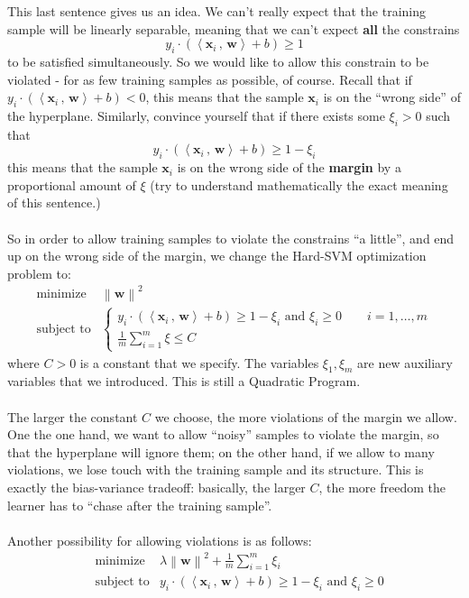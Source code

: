 \documentclass[11pt]{article}
\newcommand{\norm}[1]{\left\| #1\right\|}
\newcommand{\innerr}[2]{{\left\langle #1\,,\,#2 \right\rangle}}
\newcommand{\VV}[1]{\mathbf{#1}}
\begin{document}
  This last sentence gives us an idea. We can't really expect that the training
  sample will be linearly separable, meaning that we can't expect {\bf all} the
  constrains
   \[
    y_i \cdot \left( \innerr{\VV{x}_i}{\VV{w}}
      +b \right) \geq 1  
  \]
  to be satisfied simultaneously. So we would like to allow this constrain to be
  violated - for as few training samples as possible, of course. Recall that if
  $ y_i \cdot \left( \innerr{\VV{x}_i}{\VV{w}}
  +b \right) <0$, this means that the sample $\VV{x}_i$ is on the ``wrong side''
  of the hyperplane. Similarly, convince yourself that if there exists some
  $\xi_i>0$ such that 
  \[
  y_i \cdot \left( \innerr{\VV{x}_i}{\VV{w}}
+b \right) \geq 1-\xi_i  \]
this means that the sample $\VV{x}_i$ is  on the wrong side of the {\bf margin}
by a proportional amount of $\xi$ (try to understand mathematically the exact meaning of this
sentence.)
\\~\\ So in order to allow training samples to violate the constrains ``a
little'', and end up on the wrong side of the margin, we change the Hard-SVM
optimization problem to:
\begin{eqnarray*}
      & \text{minimize}   &  \norm {\VV{w}}^2 \\
      & \text{subject to} & \begin{cases} y_i \cdot \left( \innerr{\VV{x}_i}{\VV{w}}
     +b \right) \geq 1-\xi_i  \,\,\text{and}\,\, \xi_i\geq 0 \qquad 
i=1,\ldots,m & \\
 \frac{1}{m}\sum_{i=1}^m \xi \leq C &
 \end{cases}
    \end{eqnarray*}
    where $C>0$ is a constant that we specify. The variables $\xi_1,\xi_m$ are
    new auxiliary variables that we introduced. This is still a Quadratic
    Program.
    \\~\\
    The larger the constant $C$ we choose, the more violations of the margin we
    allow. One the one hand, we want to allow ``noisy'' samples to violate the
    margin, so that the hyperplane will ignore them; on the other hand, 
    if we allow to many violations, we lose touch with the training sample and
    its structure. This is exactly the bias-variance tradeoff: basically, the
    larger $C$, the more freedom the learner has to ``chase after the training
    sample''. 
\\~\\
Another possibility for allowing violations is as follows:
\begin{eqnarray*}
      & \text{minimize}   &  \lambda \norm {\VV{w}}^2 + \frac{1}{m}\sum_{i=1}^m
      \xi_i \\
      & \text{subject to} & y_i \cdot \left( \innerr{\VV{x}_i}{\VV{w}}
     +b \right) \geq 1-\xi_i  \,\,\text{and}\,\, \xi_i\geq 0 
    \end{eqnarray*}
\end{document}
